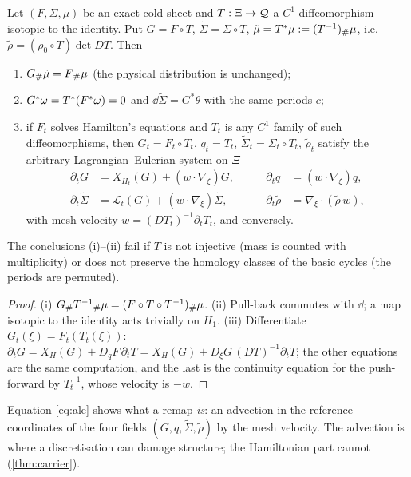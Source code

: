 \begin{theorem}\label{thm:gauge}
Let $(F,\Sigma,\mu)$ be an exact cold sheet and $T:\Xi\to\mathcal{Q}$ a $C^1$ diffeomorphism isotopic to the identity. Put
$G=F\circ T$, $\tilde\Sigma=\Sigma\circ T$, $\tilde\mu=T^*\mu:=(T^{-1}){}_{\#}\mu$, i.e.\ $\tilde\rho=(\rho_0\circ T)\det DT$. Then
\begin{enumerate}[label=(\roman*),leftmargin=2.2em,itemsep=1pt]
\item $G{}_{\#}\tilde\mu=F{}_{\#}\mu$ (the physical distribution is unchanged);
\item $G^*\omega=T^*(F^*\omega)=0$ and $\dd\tilde\Sigma=G^*\theta$ with the same periods $c$;
\item if $F_t$ solves Hamilton's equations and $T_t$ is any $C^1$ family of such diffeomorphisms, then
$G_t=F_t\circ T_t$, $q_t=T_t$, $\tilde\Sigma_t=\Sigma_t\circ T_t$, $\tilde\rho_t$ satisfy the arbitrary
Lagrangian--Eulerian system on $\Xi$
\begin{equation}\label{eq:ale}
\begin{aligned}
\partial_tG&=X_{H_t}(G)+(w\cdot\nabla_\xi)G,&\qquad \partial_tq&=(w\cdot\nabla_\xi)q,\\
\partial_t\tilde\Sigma&=\mathcal{L}_t(G)+(w\cdot\nabla_\xi)\tilde\Sigma,&\qquad \partial_t\tilde\rho&=\nabla_\xi\cdot(\tilde\rho\,w),
\end{aligned}
\end{equation}
with mesh velocity $w=(DT_t)^{-1}\partial_tT_t$, and conversely.
\end{enumerate}
The conclusions (i)--(ii) fail if $T$ is not injective (mass is counted with multiplicity) or does not preserve
the homology classes of the basic cycles (the periods are permuted).
\end{theorem}
\begin{proof}
(i) $G{}_{\#} T^{-1}{}_{\#}\mu=(F\circ T\circ T^{-1}){}_{\#}\mu$. (ii) Pull-back commutes with $\dd$; a map isotopic to the
identity acts trivially on $H_1$. (iii) Differentiate $G_t(\xi)=F_t(T_t(\xi))$:
$\partial_tG=X_H(G)+D_qF\,\partial_tT=X_H(G)+D_\xi G\,(DT)^{-1}\partial_tT$; the other equations are the same
computation, and the last is the continuity equation for the push-forward by $T_t^{-1}$, whose velocity is $-w$.
\end{proof}

Equation \eqref{eq:ale} shows what a remap \emph{is}: an advection in the reference coordinates of the four
fields $(G,q,\tilde\Sigma,\tilde\rho)$ by the mesh velocity. The advection is where a discretisation can damage
structure; the Hamiltonian part cannot (\cref{thm:carrier}).


